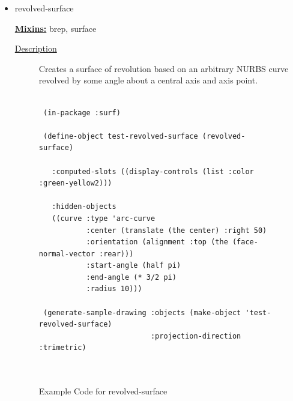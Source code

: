 \documentclass [11pt]{book}
\begin{document}
\begin{itemize}
\item {}revolved-surface


\textbf{
\underline{Mixins:}} brep, surface





\begin{description}

\item [
\underline{Description}]


Creates a surface of revolution based on an arbitrary NURBS curve revolved by some angle about
a central axis and axis point.



\end{description}




\begin{figure}
\begin{lrbox}{\boxedverb}
\begin{minipage}{\linewidth}
{\small

\begin{verbatim}

 (in-package :surf)

 (define-object test-revolved-surface (revolved-surface)

   :computed-slots ((display-controls (list :color :green-yellow2)))

   :hidden-objects 
   ((curve :type 'arc-curve
           :center (translate (the center) :right 50)
           :orientation (alignment :top (the (face-normal-vector :rear)))
           :start-angle (half pi)
           :end-angle (* 3/2 pi)
           :radius 10)))
 
 (generate-sample-drawing :objects (make-object 'test-revolved-surface)
                          :projection-direction :trimetric)
 
 
\end{verbatim}}
\end{minipage}
\end{lrbox}
\fbox{\usebox{\boxedverb}}

\caption{Example Code for revolved-surface}

\label{fig:example-code-revolved-surface}

\end{figure}


\end{itemize}
\end{document}
